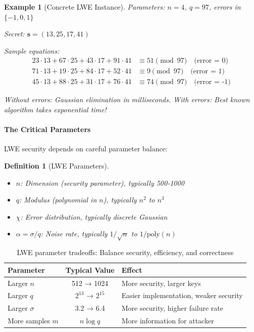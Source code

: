 \documentclass[11pt,a4paper]{article}
\newtheorem{definition}{Definition}
\newtheorem{example}{Example}
\begin{document}
\begin{example}[Concrete LWE Instance]
Parameters: $n = 4$, $q = 97$, errors in $\{-1, 0, 1\}$

Secret: $\mathbf{s} = (13, 25, 17, 41)$

Sample equations:
\begin{align}
23 \cdot 13 + 67 \cdot 25 + 43 \cdot 17 + 91 \cdot 41 &\equiv 51 \pmod{97} \quad \text{(error = 0)}\\
71 \cdot 13 + 19 \cdot 25 + 84 \cdot 17 + 52 \cdot 41 &\equiv 9 \pmod{97} \quad \text{(error = 1)}\\
45 \cdot 13 + 88 \cdot 25 + 31 \cdot 17 + 76 \cdot 41 &\equiv 74 \pmod{97} \quad \text{(error = -1)}
\end{align}

Without errors: Gaussian elimination in milliseconds.
With errors: Best known algorithm takes exponential time!
\end{example}

\paragraph{The Critical Parameters}

LWE security depends on careful parameter balance:

\begin{definition}[LWE Parameters]
\begin{itemize}
    \item $n$: Dimension (security parameter), typically 500-1000
    \item $q$: Modulus (polynomial in $n$), typically $n^2$ to $n^3$
    \item $\chi$: Error distribution, typically discrete Gaussian
    \item $\alpha = \sigma/q$: Noise rate, typically $1/\sqrt{n}$ to $1/\text{poly}(n)$
\end{itemize}
\end{definition}

\begin{table}[h]
\centering
\begin{tabular}{|l|c|l|}
\hline
\textbf{Parameter} & \textbf{Typical Value} & \textbf{Effect} \\
\hline
Larger $n$ & 512 → 1024 & More security, larger keys \\
Larger $q$ & $2^{13}$ → $2^{15}$ & Easier implementation, weaker security \\
Larger $\sigma$ & 3.2 → 6.4 & More security, higher failure rate \\
More samples $m$ & $n \log q$ & More information for attacker \\
\hline
\end{tabular}
\caption{LWE parameter tradeoffs: Balance security, efficiency, and correctness}
\end{table}
\end{document}
